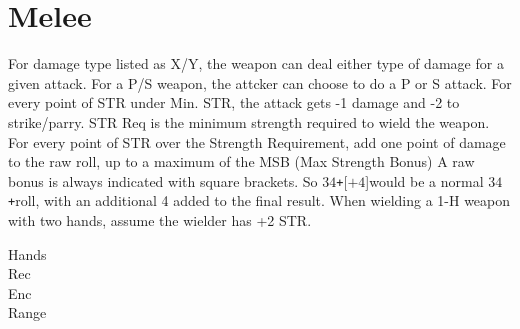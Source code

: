 \documentclass[twoside]{book}
\begin{document}
\section{Melee}
      For damage type listed as X/Y, the weapon can deal
             either type of damage for a given attack. For a P/S weapon,
             the attcker can choose to do a P or S attack. For every
             point of STR under Min. STR, the attack gets -1 damage and
             -2 to strike/parry. STR Req is the minimum strength required
             to wield the weapon. For every point of STR over the
             Strength Requirement, add one point of damage to the raw
             roll, up to a maximum of the MSB (Max Strength Bonus) A raw
             bonus is always indicated with square brackets. So \ensuremath{3}\ensuremath{4}\texttt{+}\textscbf{}[\ensuremath{\texttt{+}\ensuremath{4}}]would be a normal \ensuremath{3}\ensuremath{4}\texttt{+}roll, with an additional 4
             added to the final result. When wielding a 1-H weapon with
             two hands, assume the wielder has +2 STR. 
\begin{description}
    
  \item[ Hands ] 
  \item[ Rec ] 
  \item[ Enc ] 
  \item[ Range ] 
\end{description}
  
    
\end{document}
